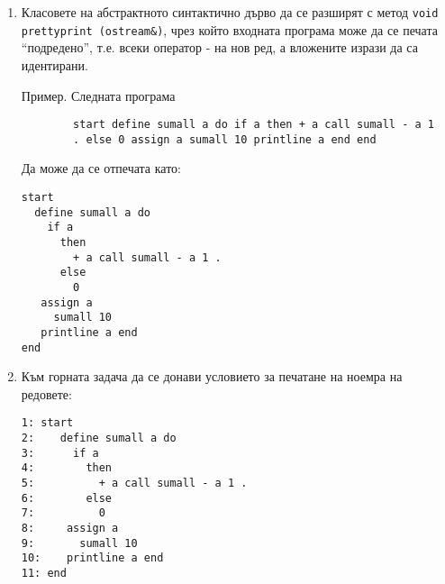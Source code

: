 \documentclass[12pt,a4paper]{article}
\begin{document}
\begin{enumerate}
\begin{flushleft}
	\end{flushleft}

	\item Класовете на абстрактното синтактично дърво да се разширят с метод \texttt{void prettyprint (ostream\&)}, чрез който входната програма може да се печата ``подредено'', т.е. всеки оператор - на нов ред, а вложените изрази да са идентирани.

	Пример. Следната програма
	\begin{verbatim}
		start define sumall a do if a then + a call sumall - a 1 
		. else 0 assign a sumall 10 printline a end end
	\end{verbatim}

	Да може да се отпечата като:

	\begin{verbatim}
start
  define sumall a do 
    if a 
      then 
        + a call sumall - a 1 . 
      else 
        0 
   assign a 
     sumall 10 
   printline a end
end   
	\end{verbatim}

	\item Към горната задача да се донави условието за печатане на ноемра на редовете:
	\begin{verbatim}
1: start
2:    define sumall a do 
3:      if a 
4:        then 
5:          + a call sumall - a 1 . 
6:        else 
7:          0 
8:     assign a 
9:       sumall 10 
10:    printline a end
11: end   

	\end{verbatim}


\end{enumerate}
\end{document}
